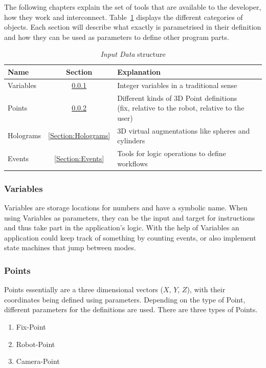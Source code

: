 The following chapters explain the set of tools that are available to the developer, how they work and interconnect. Table~\ref{Table:InputDataStructure} displays the different categories of objects. Each section will describe what exactly is parametrised in their definition and how they can be used as parameters to define other program parts.

\begin{table}[ht]
	\caption{\textit{Input Data} structure}
	\label{Table:InputDataStructure}
	\centering
	\begin{tabular}{lcl}
		\toprule
		Name & Section		& Explanation	\\		
		\midrule
		Variables & \ref{Section:Variables}		& Integer variables in a traditional sense \\
		Points& \ref{Section:Points}		& \parbox[t]{10cm}{Different kinds of 3D Point definitions\\(fix, relative to the robot, relative to the user)} 	 \\
		Holograms& \ref{Section:Holograms} & 3D virtual augmentations like spheres and cylinders\\
		Events& \ref{Section:Events} & Tools for logic operations to define workflows \\
		\bottomrule
	\end{tabular}
\end{table}

\subsubsection{Variables}\label{Section:Variables}
Variables are storage locations for numbers and have a symbolic name. When using Variables as parameters, they can be the input and target for instructions and thus take part in the application's logic. With the help of Variables an application could keep track of something by counting events, or also implement state machines that jump between modes.

\subsubsection{Points}\label{Section:Points}
 
Points essentially are a three dimensional vectors ($X$, $Y$, $Z$), with their coordinates being defined using parameters. Depending on the type of Point, different parameters for the definitions are used. There are three types of Points.
\begin{enumerate}
	\setlength\itemsep{-1em}
	\item Fix-Point
	\item Robot-Point
	\item Camera-Point
\end{enumerate}

